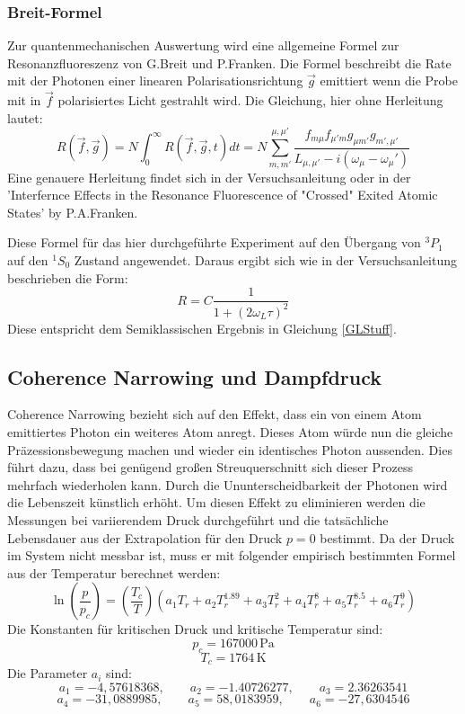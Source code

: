 \subsubsection{Breit-Formel}
Zur quantenmechanischen Auswertung wird eine allgemeine Formel zur Resonanzfluoreszenz von G.Breit und P.Franken. Die Formel beschreibt die Rate mit der Photonen einer linearen Polarisationsrichtung $\vec{g}$ emittiert wenn die Probe mit in $\vec{f}$ polarisiertes Licht gestrahlt wird. Die Gleichung, hier ohne Herleitung lautet:
\begin{equation}
	R(\vec{f},\vec{g})=N\int_{0}^{\infty}R(\vec{f},\vec{g},t)dt=N\sum_{m,m'}^{\mu,\mu'}\frac{f_{m\mu}f_{\mu'm}g_{\mu m'}g_{m',\mu'}}{L_{\mu,\mu'}-i(\omega_\mu -\omega_\mu')}
\end{equation}
Eine genauere Herleitung findet sich in der Versuchsanleitung\cite{anleitung} oder in der 'Interfernce Effects in the Resonance Fluorescence of "Crossed" Exited Atomic States' by P.A.Franken.\cite{Franken} \par
Diese Formel für das hier durchgeführte Experiment auf den Übergang von $^3P_1$ auf den $^1S_0$ Zustand angewendet. Daraus ergibt sich wie in der Versuchsanleitung \cite{anleitung} beschrieben die Form:
\begin{equation}
R=C\frac{1}{1+(2\omega_L\tau)^2}
\end{equation}
Diese entspricht dem Semiklassischen Ergebnis in Gleichung \ref{GLStuff}.
\subsection{Coherence Narrowing und Dampfdruck}
Coherence Narrowing bezieht sich auf den Effekt, dass ein von einem Atom emittiertes Photon ein weiteres Atom anregt. Dieses Atom würde nun die gleiche Präzessionsbewegung machen und wieder ein identisches Photon aussenden. Dies führt dazu, dass bei genügend großen Streuquerschnitt sich dieser Prozess mehrfach wiederholen kann. Durch die Ununterscheidbarkeit der Photonen wird die Lebenszeit künstlich erhöht. Um diesen Effekt zu eliminieren werden die Messungen bei variierendem Druck durchgeführt und die tatsächliche Lebensdauer aus der Extrapolation für den Druck $p = 0$ bestimmt. Da der Druck im System nicht messbar ist, muss er mit folgender empirisch bestimmten Formel aus
der Temperatur berechnet werden: 
\begin{equation}
	\ln(\frac{p}{p_c})=(\frac{T_c}{T})(a_1T_r+a_2T_r^{1.89}+a_3T_r^2+a_4T_r^8+a_5T_r^{8.5}+a_6T_r^9)
	\label{Coherence}
\end{equation}
Die Konstanten für kritischen Druck und kritische Temperatur sind:
 $$p_c=167000\,\text{Pa}$$
 $$T_c=1764\,\text{K}$$
Die Parameter $a_i$ sind:
$$a_1=-4,57618368, \qquad a_2 = -1.40726277, \qquad a_3 = 2.36263541$$
$$a_4 = -31,0889985, \qquad a_5 = 58,0183959,\qquad a_6 = -27,6304546$$
